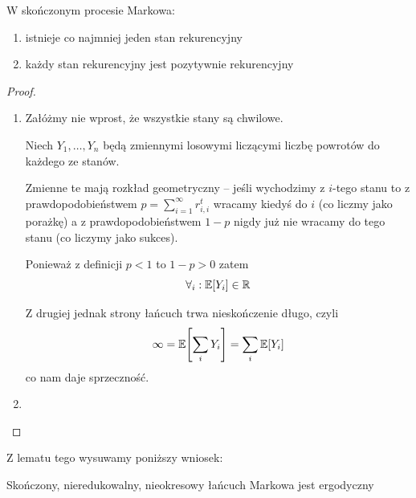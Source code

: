 \begin{lemma}
	W skończonym procesie Markowa:
	\begin{enumerate}
		\item istnieje co najmniej jeden stan rekurencyjny
		\item każdy stan rekurencyjny jest pozytywnie rekurencyjny
	\end{enumerate}

\end{lemma}
\begin{proof} \( \) \\
	\begin{enumerate}
		\item Załóżmy nie wprost, że wszystkie stany są chwilowe.

		      Niech \( Y_1, \dots, Y_n \) będą zmiennymi losowymi liczącymi liczbę powrotów do każdego ze stanów.

		      Zmienne te mają rozkład geometryczny -- jeśli wychodzimy z \(i\)-tego stanu to z prawdopodobieństwem \(p = \sum_{i = 1}^\infty r_{i, i}^t \) wracamy kiedyś do \( i \) (co liczmy jako porażkę) a z prawdopodobieństwem \( 1 - p \) nigdy już nie wracamy do tego stanu (co liczymy jako sukces).

		      Ponieważ z definicji \( p < 1 \) to \( 1 - p > 0 \)
		      zatem
		      \[
			      \forall_i : \expected{Y_i} \in \real
		      \]

		      Z drugiej jednak strony łańcuch trwa nieskończenie długo, czyli
		      \[
			      \infty = \expected{\sum_i Y_i} = \sum_i \expected{Y_i}
		      \]
		      co nam daje sprzeczność.

		\item

	\end{enumerate}
\end{proof}

Z lematu tego wysuwamy poniższy wniosek:
\begin{lemma}
	Skończony, nieredukowalny, nieokresowy łańcuch Markowa jest ergodyczny
\end{lemma}


